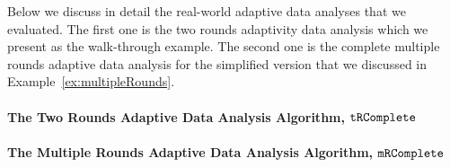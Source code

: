  Below we discuss in detail the real-world adaptive data analyses that we evaluated.
 The first one is the two rounds adaptivity data analysis which we present as the walk-through example.
 The second one is the complete multiple rounds adaptive data analysis for the simplified version that we discussed in Example~\ref{ex:multipleRounds}.

 \paragraph{The Two Rounds Adaptive Data Analysis Algorithm, $\mathtt{tRComplete}$} 
 
 \paragraph{The Multiple Rounds Adaptive Data Analysis Algorithm, $\mathtt{mRComplete}$} 
 

